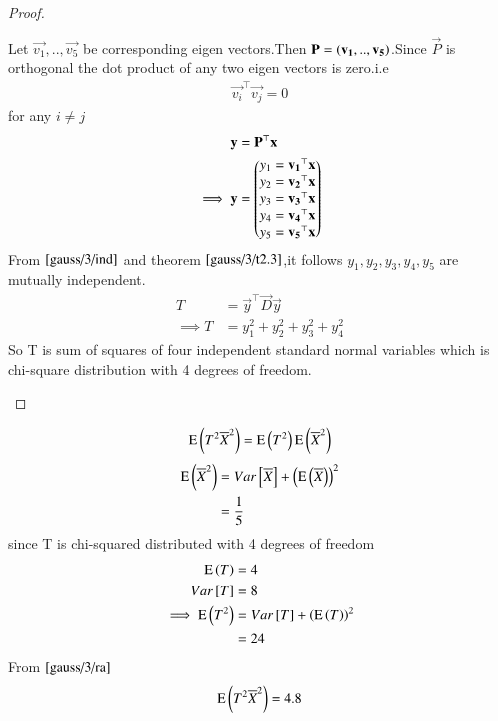 \begin{proof}
\begin{enumerate}
\begin{enumerate}
    Let $\vec{v_1},..,\vec{v_5}$ be corresponding eigen vectors.Then $\mathbf{P}=\left(\mathbf{v_1},..,\mathbf{v_5}\right)$.Since $\vec{P}$ is orthogonal the dot product of any two eigen vectors is zero.i.e
    \begin{align}
        \vec{v_i}^{\top}\vec{v_j}=0 \label{gauss/3/ind}
    \end{align}
    for any $i\neq j$
    \begin{align}
     \mathbf{y}&=\mathbf{P}^{\top}\mathbf{x}\\
     \implies 
        \mathbf{y}&=\begin{pmatrix}y_1=\mathbf{v_1}^{\top}\mathbf{x}\\
                       y_2=\mathbf{v_2}^{\top}\mathbf{x}\\
                       y_3=\mathbf{v_3}^{\top}\mathbf{x}\\
                       y_4=\mathbf{v_4}^{\top}\mathbf{x}\\
                       y_5=\mathbf{v_5}^{\top}\mathbf{x}\end{pmatrix}\\
    \end{align}
    From $\eqref{gauss/3/ind}$ and theorem $\ref{gauss/3/t2.3}$,it follows $y_1,y_2,y_3,y_4,y_5$ are mutually independent.
    \begin{align}
    T&=\vec{y}^{\top}\vec{D}\vec{y}\\
        \implies
         T&=y_1^2+y_2^2+y_3^2+y_4^2 
    \end{align}
    So T is sum of squares of four independent standard normal variables which is chi-square distribution with 4 degrees of freedom.
\end{enumerate}
\end{enumerate}
\end{proof}
\begin{align}
    \text{E}\left( T^2\overline{X}^2 \right)=\text{E}\left( T^2 \right)\text{E}\left( \overline{X}^2 \right)\label{gauss/3/ra}
\end{align}
\begin{align}
    \text{E}\left( \overline{X}^2 \right)&=Var{}\left[\overline{X}\right]+\left(\text{E}\left( \overline{X} \right)\right)^2\\
    &=\frac{1}{5}
\end{align}
 since T is chi-squared distributed with 4 degrees of freedom
 \begin{align}
     \text{E}\left( T \right)&=4\\
     Var{}\left[T\right]&=8\\
     \implies \text{E}\left( T^2 \right)&=Var{}\left[T\right]+\left(\text{E}\left( T \right)\right)^2\\
    &=24
 \end{align}
 From $\eqref{gauss/3/ra}$
\begin{align}
    \text{E}\left( T^2\overline{X}^2 \right)=4.8
\end{align}